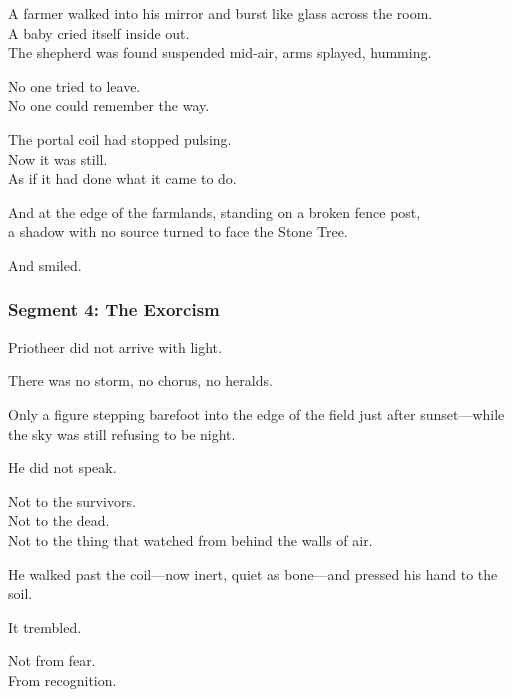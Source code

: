 \documentclass[9pt]{article}
\begin{document}
\vspace{0.5em}
A farmer walked into his mirror and burst like glass across the room.\\
A baby cried itself inside out.\\
The shepherd was found suspended mid-air, arms splayed, humming.

\vspace{0.5em}
No one tried to leave.\\
No one could remember the way.

\vspace{0.5em}
The portal coil had stopped pulsing.\\
Now it was still.\\
As if it had done what it came to do.

\vspace{0.5em}
And at the edge of the farmlands, standing on a broken fence post,\\
a shadow with no source turned to face the Stone Tree.

\vspace{0.5em}
And smiled.

\newpage

\subsubsection*{Segment 4: The Exorcism}

Priotheer did not arrive with light.

\vspace{0.5em}
There was no storm, no chorus, no heralds.

\vspace{0.5em}
Only a figure stepping barefoot into the edge of the field just after sunset---while the sky was still refusing to be night.

\vspace{0.5em}
He did not speak.

\vspace{0.5em}
Not to the survivors.\\
Not to the dead.\\
Not to the thing that watched from behind the walls of air.

\vspace{0.5em}
He walked past the coil---now inert, quiet as bone---and pressed his hand to the soil.

\vspace{0.5em}
It trembled.

\vspace{0.5em}
Not from fear.\\
From recognition.
\end{document}
